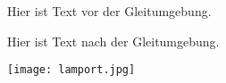 Hier ist Text vor der Gleitumgebung.

Hier ist Text nach der Gleitumgebung.

\texttt{[image: lamport.jpg]}
